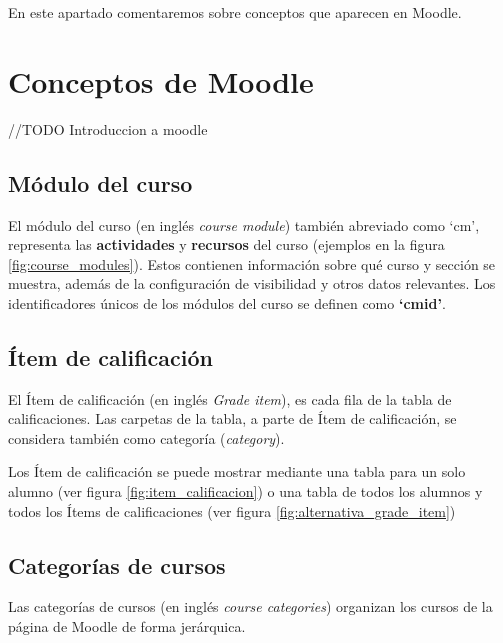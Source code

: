 
En este apartado comentaremos sobre conceptos que aparecen en Moodle.



\section{Conceptos de Moodle}

//TODO Introduccion a moodle

\subsection{Módulo del curso}
El módulo del curso\cite{noauthor_course_nodate} (en inglés \textit{course module}) también abreviado como `cm', representa las \textbf{actividades} y \textbf{recursos} del curso (ejemplos en la figura \ref{fig:course_modules}). Estos contienen información sobre qué curso y sección se muestra, además de la configuración de visibilidad y otros datos relevantes. Los identificadores únicos de los módulos del curso se definen como \textbf{`cmid'}. 


\subsection{Ítem de calificación}
El Ítem de calificación\cite{noauthor_grade_nodate} (en inglés \textit{Grade item}), es cada fila de la tabla de calificaciones.
Las carpetas de la tabla, a parte de Ítem de calificación, se considera también como categoría (\textit{category}).

Los Ítem de calificación se puede mostrar mediante una tabla para un solo alumno (ver figura \ref{fig:item_calificacion}) o una tabla de todos los alumnos y todos los Ítems de calificaciones (ver figura \ref{fig:alternativa_grade_item})
	


\subsection{Categorías de cursos}
Las categorías de cursos\cite{noauthor_course_nodate-1} (en inglés \textit{course categories}) organizan los cursos de la página de Moodle de forma jerárquica.

